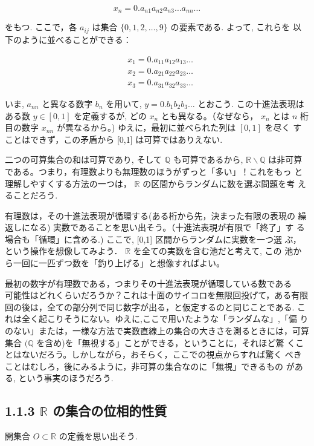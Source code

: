 \documentclass[14pt]{jsarticle}
\begin{document}
$$
x_{n}=0 . a_{n 1} a_{n 2} a_{n 3} \ldots a_{n n} \ldots
$$

をもつ. ここで，各 $a_{i j}$ は集合 $\{0,1,2, \ldots, 9\}$ の要素である. よって, これらを 以下のように並べることができる：

$$
\begin{aligned}
& x_{1}=0 . a_{11} a_{12} a_{13} \ldots \\
& x_{2}=0 . a_{21} a_{22} a_{23} \ldots \\
& x_{3}=0 . a_{31} a_{32} a_{33} \ldots
\end{aligned}
$$

いま, $a_{n n}$ と異なる数字 $b_{n}$ を用いて, $y=0 . b_{1} b_{2} b_{3} \ldots$ とおこう. この十進法表現はある数 $y \in[0,1]$ を定義するが, どの $x_{n}$ とも異なる。（なぜなら， $x_{n}$ とは $n$ 桁目の数字 $x_{n n}$ が異なるから。) ゆえに，最初に並べられた列は $[0,1]$ を尽く すことはできず，この矛盾から [0,1] は可算ではありえない.

二つの可算集合の和は可算であり, そして $\mathbb{Q}$ も可算であるから, $\mathbb{R} \backslash \mathbb{Q}$ は非可算である。つまり，有理数よりも無理数のほうがずっと「多い」！これをもっ と理解しやすくする方法の一つは， $\mathbb{R}$ の区間からランダムに数を選ぶ問題を考 えることだろう.

有理数は，その十進法表現が循環する(ある桁から先，決まった有限の表現の 繰返しになる) 実数であることを思い出そう。（十進法表現が有限で「終了」す る場合も「循環」に含める.) ここで, [0,1] 区間からランダムに実数を一つ選 ぶ，という操作を想像してみよう． $\mathbb{R}$ を全ての実数を含む池だと考えて, この 池から一回に一匹ずつ数を「釣り上げる」と想像すればよい。

最初の数字が有理数である，つまりその十進法表現が循環している数である\\
可能性はどれくらいだろうか？これは十面のサイコロを無限回投げて，ある有限回の後は，全ての部分列で同じ数字が出る，と仮定するのと同じことである. これは全く起こりそうにない。ゆえに,ここで用いたような「ランダムな」,「偏 りのない」または，一様な方法で実数直線上の集合の大きさを測るときには，可算集合 $(\mathbb{Q}$ を含め)を「無視する」ことができる，ということに，それほど驚 くことはないだろう。しかしながら，おそらく，ここでの視点からすれば驚く べきことはむしろ，後にみるように，非可算の集合なのに「無視」できるもの がある, という事実のほうだろう.

\subsection*{1.1.3 $\mathbb{R}$ の集合の位相的性質}
開集合 $O \subset \mathbb{R}$ の定義を思い出そう.
\end{document}

